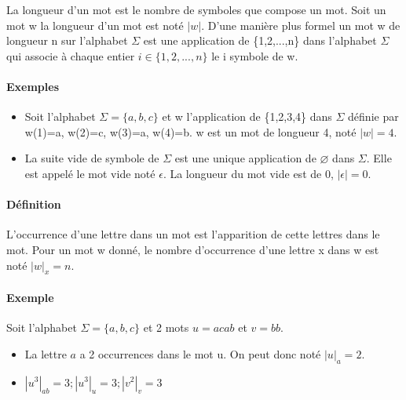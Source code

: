 La longueur d'un mot est le nombre de symboles que compose un mot. Soit un mot w la longueur d'un mot est noté $\left|w\right|$. D'une manière plus formel un mot w de longueur n sur l'alphabet $\Sigma$ est une application de \{1,2,...,n\} dans l'alphabet $\Sigma$ qui associe à chaque entier $i \in \{1,2,...,n\}$ le i symbole de w.



\paragraph{Exemples} %
\label{par:exemples}

\begin{itemize}
	\item Soit l'alphabet $\Sigma=\{a,b,c\}$ et w l'application de \{1,2,3,4\} dans $\Sigma$ définie par w(1)=a, w(2)=c, w(3)=a, w(4)=b. w est un mot de longueur 4, noté $\left|w\right| = 4$.
	\item La suite vide de symbole de $\Sigma$ est une unique application de $\varnothing$ dans $\Sigma$. Elle est appelé le mot vide noté $\epsilon$. La longueur du mot vide est de 0, $\left|\epsilon\right| = 0$.
\end{itemize}




\paragraph{Définition} %
\label{par:d_finition}

L’occurrence d'une lettre dans un mot est l'apparition de cette lettres dans le mot. Pour un mot w donné, le nombre d'occurrence d'une lettre x dans w est noté $\left|w\right|_x=n$.



\paragraph{Exemple} %
\label{par:exemple}

Soit l'alphabet $\Sigma=\{a,b,c\}$ et 2 mots $u=acab$ et $v=bb$.

\begin{itemize}
	\item La lettre $a$ a 2 occurrences dans le mot u. On peut donc noté $\left|u\right|_a=2$.
	\item $\left|u^3\right|_{ab}=3 ; \left|u^3\right|_u=3 ; \left|v^2\right|_v=3 $
\end{itemize}

